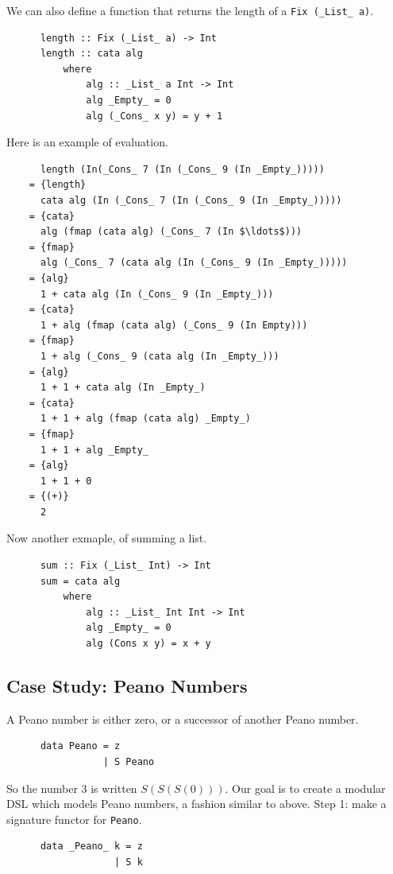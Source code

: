 \documentclass[a4paper,12pt]{article}
\theoremstyle{remark}
\begin{document}
  We can also define a function that returns the length of a \lstinline{Fix (_List_ a)}.

  \begin{lstlisting}
      length :: Fix (_List_ a) -> Int
      length :: cata alg
          where
              alg :: _List_ a Int -> Int
              alg _Empty_ = 0
              alg (_Cons_ x y) = y + 1  \end{lstlisting}

  Here is an example of evaluation.

  \begin{lstlisting}
      length (In(_Cons_ 7 (In (_Cons_ 9 (In _Empty_)))))
    = {length}
      cata alg (In (_Cons_ 7 (In (_Cons_ 9 (In _Empty_)))))
    = {cata}
      alg (fmap (cata alg) (_Cons_ 7 (In $\ldots$)))
    = {fmap}
      alg (_Cons_ 7 (cata alg (In (_Cons_ 9 (In _Empty_)))))
    = {alg}
      1 + cata alg (In (_Cons_ 9 (In _Empty_)))
    = {cata}
      1 + alg (fmap (cata alg) (_Cons_ 9 (In Empty)))
    = {fmap}
      1 + alg (_Cons_ 9 (cata alg (In _Empty_)))
    = {alg}
      1 + 1 + cata alg (In _Empty_)
    = {cata}
      1 + 1 + alg (fmap (cata alg) _Empty_)
    = {fmap}
      1 + 1 + alg _Empty_
    = {alg}
      1 + 1 + 0
    = {(+)}
      2  \end{lstlisting}

  Now another exmaple, of summing a list.

  \begin{lstlisting}
      sum :: Fix (_List_ Int) -> Int
      sum = cata alg
          where
              alg :: _List_ Int Int -> Int
              alg _Empty_ = 0
              alg (Cons x y) = x + y  \end{lstlisting}

  \subsection{Case Study: Peano Numbers}

  A Peano number is either zero, or a successor of another Peano number.

  \begin{lstlisting}
      data Peano = z
                 | S Peano  \end{lstlisting}

  So the number 3 is written $S(S(S (0)))$. Our goal is to create a
  modular DSL which models Peano numbers, a fashion similar to above.
  Step 1: make a signature functor for \lstinline{Peano}.

  \begin{lstlisting}
      data _Peano_ k = z
                   | S k  \end{lstlisting}
\end{document}
